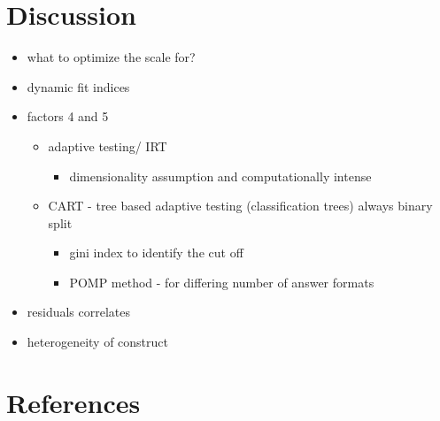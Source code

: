 \documentclass[
  12pt,
  a4paper,
  twoside]{article}
\providecommand{\tightlist}{%
  \setlength{\itemsep}{0pt}\setlength{\parskip}{0pt}}
\begin{document}
\hypertarget{discussion}{%
\section{Discussion}\label{discussion}}

\begin{itemize}
\tightlist
\item
  what to optimize the scale for?
\item
  dynamic fit indices
\item
  factors 4 and 5

  \begin{itemize}
  \tightlist
  \item
    adaptive testing/ IRT

    \begin{itemize}
    \tightlist
    \item
      dimensionality assumption and computationally intense
    \end{itemize}
  \item
    CART - tree based adaptive testing (classification trees) always binary split

    \begin{itemize}
    \tightlist
    \item
      gini index to identify the cut off
    \item
      POMP method - for differing number of answer formats
    \end{itemize}
  \end{itemize}
\item
  residuals correlates
\item
  heterogeneity of construct
\end{itemize}

\hypertarget{references}{%
\section*{References}\label{references}}
\end{document}
